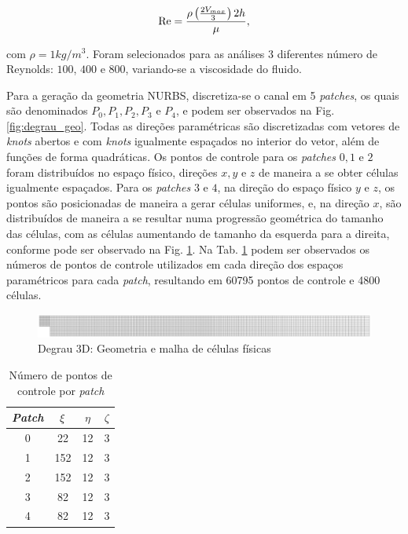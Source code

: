 \documentclass[tese_patricia]{subfiles}
\begin{document}
\begin{align}
\mathrm{Re} =\frac{\rho\left(\frac{2V_{max}}{3}\right)2h}{\mu},
\end{align}

\noindent com $\rho = 1kg/m^{3}$. Foram selecionados para as análises 3 diferentes número de Reynolds: $100$, $400$ e $800$, variando-se a viscosidade do fluido.

Para a geração da geometria NURBS, discretiza-se o canal em 5 \textit{patches}, os quais são denominados $P_{0},P_{1},P_{2},P_{3}$ e $P_{4}$, e podem ser observados na Fig. \ref{fig:degrau_geo}. Todas as direções paramétricas são discretizadas com vetores de \textit{knots} abertos e com \textit{knots} igualmente espaçados no interior do vetor, além de funções de forma quadráticas. Os pontos de controle para os \textit{patches} $0,1$ e $2$ foram distribuídos no espaço físico, direções $x,y$ e $z$ de maneira a se obter células igualmente espaçados. Para os \textit{patches} $3$ e $4$, na direção do espaço físico $y$ e $z$, os pontos são posicionadas de maneira a gerar células uniformes, e, na direção $x$, são distribuídos de maneira a se resultar numa progressão geométrica do tamanho das células, com as células aumentando de tamanho da esquerda para a direita, conforme pode ser observado na Fig. \ref{fig:degrau_malha}. Na Tab. \ref{tab:numberPCpatches} podem ser observados os números de pontos de controle utilizados em cada direção dos espaços paramétricos para cada \textit{patch}, resultando em 60795 pontos de controle e 4800 células.

\begin{figure}[htb!]
	\centering
	\includegraphics[scale=0.3,trim=1cm 14cm 1cm 14cm, clip=true]{Imagens/Cap3/malhadegrau.eps}
	\caption{Degrau 3D: Geometria e malha de células físicas}
	\label{fig:degrau_malha}
\end{figure}

\begin{center}
	\begin{table}[h!]
		\caption{Número de pontos de controle por \textit{patch}}
		\centering
		\begin{tabular}{|c | c | c| c|} 
			\hline
			\textit{Patch} & $\xi$ & $\eta$ & $\zeta$ \\ 
			\hline
			0 & 22 & 12 & 3 \\ 
			\hline
			1 & 152 & 12 & 3\\
			\hline
			2 & 152 & 12 & 3\\
			\hline
			3 & 82 & 12 & 3\\
			\hline
			4 & 82 & 12 & 3\\
			\hline
		\end{tabular}
		\label{tab:numberPCpatches}
	\end{table}
\end{center}
\end{document}
